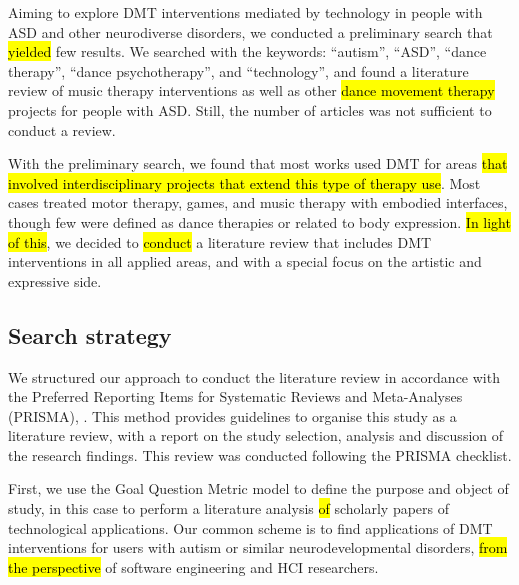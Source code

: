 \documentclass[a4paper,fleqn]{cas-sc}
\begin{document}
Aiming to explore DMT interventions mediated by technology in people with ASD and other neurodiverse disorders, we conducted a preliminary search that \hl{yielded} few results. We searched with the keywords: ``autism'', ``ASD'', ``dance therapy'', ``dance psychotherapy'', and ``technology'', and found a literature review of music therapy interventions as well as other \hl{dance movement therapy} projects for people with ASD. Still, the number of articles was not sufficient to conduct a review. 

With the preliminary search, we found that most works used DMT for areas \hl{that involved interdisciplinary projects that extend this type of therapy use}. Most cases treated motor therapy, games, and music therapy with embodied interfaces, though few were defined as dance therapies or related to body expression. \hl{In light of this}, we decided to \hl{conduct} a literature review that includes DMT interventions in all applied areas, and with a special focus on the artistic and expressive side. 

\subsection{Search strategy}
We structured our approach to conduct the literature review in accordance with the Preferred Reporting Items for Systematic Reviews and Meta-Analyses (PRISMA), \cite{Pagen71}. This method provides guidelines to organise this study as a literature review, with a report on the study selection, analysis and discussion of the research findings. This review was conducted following the PRISMA checklist.

First, we use the Goal Question Metric model \cite{Koziolek} to define the purpose and object of study, in this case to perform a literature analysis \hl{of} scholarly papers of technological applications. Our common scheme is to find applications of DMT interventions for users with autism or similar neurodevelopmental disorders, \hl{from the perspective} of software engineering and HCI researchers.

\end{document}
